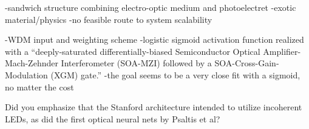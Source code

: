 
\cite{mo2000}
-sandwich structure combining electro-optic medium and photoelectret
-exotic material/physics
-no feasible route to system scalability

\cite{mots2019}
-WDM input and weighting scheme
-logistic sigmoid activation function realized with a ``deeply-saturated differentially-biased Semiconductor Optical Amplifier-Mach-Zehnder Interferometer (SOA-MZI) followed by a SOA-Cross-Gain-Modulation (XGM) gate.''
-the goal seems to be a very close fit with a sigmoid, no matter the cost

\vspace{3em}
Did you emphasize that the Stanford architecture intended to utilize incoherent LEDs, as did the first optical neural nets by Psaltis et al?
